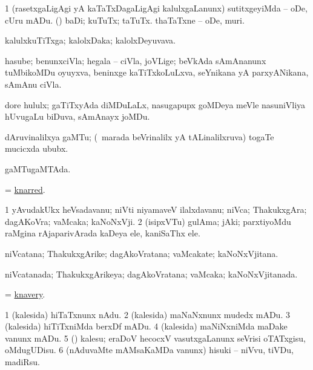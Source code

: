 \bentry
{}
\gl{\sakirx}
\bmng
\bnum
\num{1} (rasetxgaLigAgi yA kaTaTxDagaLigAgi kalulxgaLanunx) sutitxgeyiMda -- oDe, cUru mADu. 
 (\pArxparx) 
\banum
{} baDi; kuTuTx; taTuTx. 
 thaTaTxne -- oDe, muri. 
\eanum
\numie
\enum
\emng
\eentry

\bentry
{}
\gl{\nA}
\bmng
kalulxkuTiTxga; kalolxDaka; kalolxDeyuvava. 
\emng
\eentry

\bentry
{}
\gl{\nA}
\bmng
hasube; benunxciVla; hegala -- ciVla, joVLige; beVkAda sAmAnanunx tuMbikoMDu oyuyxva, beninxge kaTiTxkoLuLxva, seYnikana yA parxyANikana, sAmAnu ciVla.  
\emng
\eentry

\bentry
{}
\gl{\nA}
\bmng
dore hululx; gaTiTxyAda diMDuLaLx, nasugapupx goMDeya meVle nasuniVliya hUvugaLu biDuva, sAmAnayx joMDu. 
\emng
\eentry

\bentry
{}
\gl{\nA}
\bmng
dAruvinalilxya gaMTu; (\kanmu\ marada beVrinalilx yA tALinalilxruva) togaTe mucicxda ububx. 
\emng
\eentry

\bentry
{}
\gl{\gu}
\bmng
gaMTugaMTAda. 
\emng
\eentry

\bentry
{}
\gl{\gu}
\bmng
 = \hyperlink{knarred}{knarred}. 
\emng
\eentry

\bentry
{}
\gl{\nA}
\bmng
\bnum
\num{1} yAvudakUkx heVsadavanu; niVti niyamaveV ilalxdavanu; niVca; ThakukxgAra; dagAKoVra; vaMcaka; kaNoNxVji. 
\num{2} (isipxVTu) gulAma; jAki; parxtiyoMdu raMgina rAjaparivArada kaDeya ele, kaniSaThx ele. 
\enum
\emng
\eentry

\bentry
{}
\gl{\nA}
\bmng
niVcatana; ThakukxgArike; dagAkoVratana; vaMcakate; kaNoNxVjitana. 
\emng
\eentry

\bentry
{}
\gl{\gu}
\bmng
niVcatanada; ThakukxgArikeya; dagAkoVratana; vaMcaka; kaNoNxVjitanada. 
\emng
\eentry

\bentry
{}
\gl{\nA}
\bmng
 = \hyperlink{knavery}{knavery}. 
\emng
\eentry

\bentry
{}
\gl{\sakirx}
\bmng
\bnum
\num{1} (kalesida) hiTaTxnunx nAdu. 
\num{2} (kalesida) maNaNxnunx mudedx mADu. 
\num{3} (kalesida) hiTiTxniMda berxDf mADu. 
\num{4} (kalesida) maNiNxniMda maDake \mo vanunx mADu. 
\num{5} (\rUpa) kalesu; eraDoV hecocxV vasutxgaLanunx seVrisi oTATxgisu, oMdugUDisu. 
\num{6} (nAduvaMte mAMsaKaMDa \mo vanunx) hisuki -- niVvu, tiVDu, madiRsu. 
\enum
\emng
\eentry


